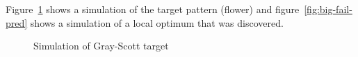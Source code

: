 Figure~\ref{fig:big-fail-true} shows a simulation of the target pattern (flower) and figure~\ref{fig:big-fail-pred} shows a simulation of a local optimum that was discovered.\\

\begin{figure}
            \hfill
            \hfill
            \hfill
            \hfill
            \hfill
            \caption{Simulation of Gray-Scott target}
\label{fig:big-fail-true}
\end{figure}

